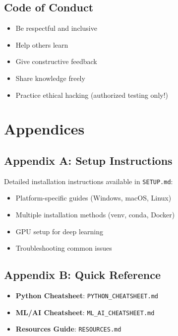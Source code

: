 \documentclass[11pt,letterpaper]{article}
\begin{document}
\subsection{Code of Conduct}
\begin{itemize}[leftmargin=*]
    \item Be respectful and inclusive
    \item Help others learn
    \item Give constructive feedback
    \item Share knowledge freely
    \item Practice ethical hacking (authorized testing only!)
\end{itemize}

\section{Appendices}

\subsection{Appendix A: Setup Instructions}
Detailed installation instructions available in \texttt{SETUP.md}:
\begin{itemize}[leftmargin=*]
    \item Platform-specific guides (Windows, macOS, Linux)
    \item Multiple installation methods (venv, conda, Docker)
    \item GPU setup for deep learning
    \item Troubleshooting common issues
\end{itemize}

\subsection{Appendix B: Quick Reference}
\begin{itemize}[leftmargin=*]
    \item \textbf{Python Cheatsheet}: \texttt{PYTHON\_CHEATSHEET.md}
    \item \textbf{ML/AI Cheatsheet}: \texttt{ML\_AI\_CHEATSHEET.md}
    \item \textbf{Resources Guide}: \texttt{RESOURCES.md}
\end{itemize}
\end{document}
